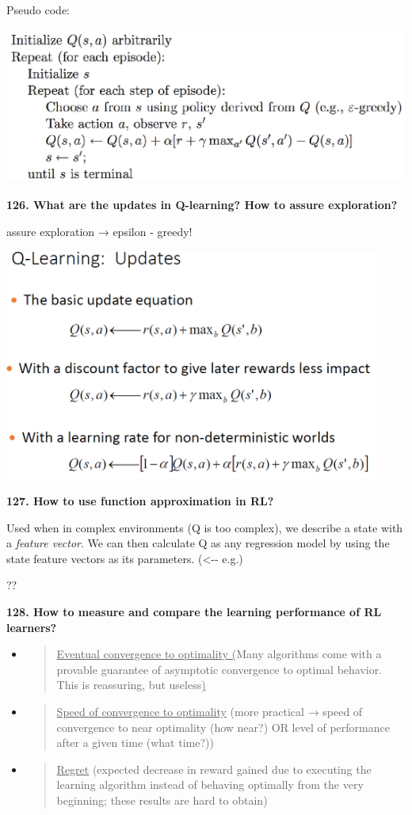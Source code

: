 Pseudo code:

\includegraphics[width=5.45737in,height=2.02158in]{media/image14.png}

\textbf{126. What are the updates in Q-learning? How to assure
exploration?}

assure exploration → epsilon - greedy!

\includegraphics[width=4.86979in,height=3.00024in]{media/image4.png}

\textbf{127. How to use function approximation in RL?}

Used when in complex environments (Q is too complex), we describe a
state with a \emph{feature vector}. We can then calculate Q as any
regression model by using the state feature vectors as its parameters.
(\textless-\/- e.g.)

??

\textbf{128. How to measure and compare the learning performance of RL
learners?}

\begin{itemize}
\item
  \begin{quote}
  \underline{Eventual convergence to optimality (}Many algorithms come
  with a provable guarantee of asymptotic convergence to optimal
  behavior. This is reassuring, but useless\underline{)}
  \end{quote}
\item
  \begin{quote}
  \underline{Speed of convergence to optimality} (more practical → speed
  of convergence to near optimality (how near?) OR level of performance
  after a given time (what time?))
  \end{quote}
\item
  \begin{quote}
  \underline{Regret} (expected decrease in reward gained due to
  executing the learning algorithm instead of behaving optimally from
  the very beginning; these results are hard to obtain)
  \end{quote}
\end{itemize}
